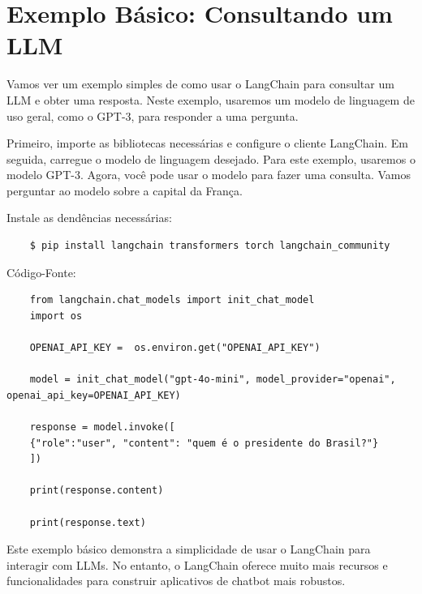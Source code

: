 \documentclass[a4paper,oneside]{book}
\begin{document}
\section{Exemplo Básico: Consultando um LLM}

Vamos ver um exemplo simples de como usar o LangChain para consultar um LLM e obter uma resposta. Neste exemplo, usaremos um modelo de linguagem de uso geral, como o GPT-3, para responder a uma pergunta.

Primeiro, importe as bibliotecas necessárias e configure o cliente LangChain. Em seguida, carregue o modelo de linguagem desejado. Para este exemplo, usaremos o modelo GPT-3. Agora, você pode usar o modelo para fazer uma consulta. Vamos perguntar ao modelo sobre a capital da França.

Instale as dendências necessárias:

\begin{verbatim}
	$ pip install langchain transformers torch langchain_community
\end{verbatim}

Código-Fonte:

\begin{verbatim}
	from langchain.chat_models import init_chat_model
	import os

	OPENAI_API_KEY =  os.environ.get("OPENAI_API_KEY")

	model = init_chat_model("gpt-4o-mini", model_provider="openai", openai_api_key=OPENAI_API_KEY)

	response = model.invoke([
	{"role":"user", "content": "quem é o presidente do Brasil?"}
	])

	print(response.content)

	print(response.text)

\end{verbatim}

Este exemplo básico demonstra a simplicidade de usar o LangChain para interagir com LLMs. No entanto, o LangChain oferece muito mais recursos e funcionalidades para construir aplicativos de chatbot mais robustos.



\end{document}
